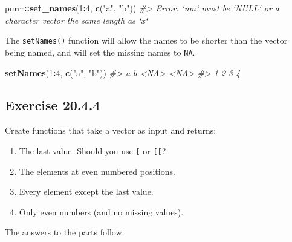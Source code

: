 \documentclass[]{book}
\newenvironment{Shaded}{\begin{snugshade}}{\end{snugshade}}
\newcommand{\CommentTok}[1]{\textcolor[rgb]{0.56,0.35,0.01}{\textit{#1}}}
\newcommand{\DecValTok}[1]{\textcolor[rgb]{0.00,0.00,0.81}{#1}}
\newcommand{\KeywordTok}[1]{\textcolor[rgb]{0.13,0.29,0.53}{\textbf{#1}}}
\newcommand{\NormalTok}[1]{#1}
\newcommand{\OperatorTok}[1]{\textcolor[rgb]{0.81,0.36,0.00}{\textbf{#1}}}
\newcommand{\StringTok}[1]{\textcolor[rgb]{0.31,0.60,0.02}{#1}}
\providecommand{\tightlist}{%
  \setlength{\itemsep}{0pt}\setlength{\parskip}{0pt}}
\theoremstyle{plain}
\theoremstyle{remark}
\theoremstyle{definition}
\theoremstyle{definition}
\theoremstyle{definition}
\theoremstyle{remark}
\begin{document}
\begin{Shaded}
\begin{Highlighting}[]
\NormalTok{purrr}\OperatorTok{::}\KeywordTok{set_names}\NormalTok{(}\DecValTok{1}\OperatorTok{:}\DecValTok{4}\NormalTok{, }\KeywordTok{c}\NormalTok{(}\StringTok{"a"}\NormalTok{, }\StringTok{"b"}\NormalTok{))}
\CommentTok{#> Error: `nm` must be `NULL` or a character vector the same length as `x`}
\end{Highlighting}
\end{Shaded}

The \texttt{setNames()} function will allow the names to be shorter than
the vector being named, and will set the missing names to \texttt{NA}.

\begin{Shaded}
\begin{Highlighting}[]
\KeywordTok{setNames}\NormalTok{(}\DecValTok{1}\OperatorTok{:}\DecValTok{4}\NormalTok{, }\KeywordTok{c}\NormalTok{(}\StringTok{"a"}\NormalTok{, }\StringTok{"b"}\NormalTok{))}
\CommentTok{#>    a    b <NA> <NA> }
\CommentTok{#>    1    2    3    4}
\end{Highlighting}
\end{Shaded}

\hypertarget{exercise-20.4.4}{%
\subsection*{\texorpdfstring{Exercise
{20.4.4}}{Exercise 20.4.4}}\label{exercise-20.4.4}}

Create functions that take a vector as input and returns:

\begin{enumerate}
\def\labelenumi{\arabic{enumi}.}
\tightlist
\item
  The last value. Should you use \texttt{{[}} or \texttt{{[}{[}}?
\item
  The elements at even numbered positions.
\item
  Every element except the last value.
\item
  Only even numbers (and no missing values).
\end{enumerate}

The answers to the parts follow.
\end{document}
